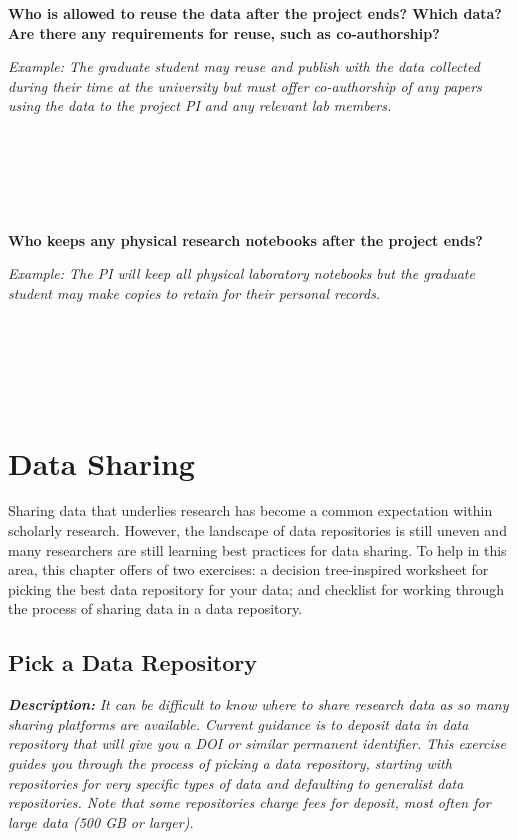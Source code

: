\documentclass[
]{book}
\begin{document}
\textbf{Who is allowed to reuse the data after the project ends? Which data? Are there any requirements for reuse, such as co-authorship?}

\emph{Example: The graduate student may reuse and publish with the data collected during their time at the university but must offer co-authorship of any papers using the data to the project PI and any relevant lab members.}

~

~

~

\textbf{Who keeps any physical research notebooks after the project ends?}

\emph{Example: The PI will keep all physical laboratory notebooks but the graduate student may make copies to retain for their personal records.}

~

~

~

\hypertarget{data-sharing}{%
\chapter{Data Sharing}\label{data-sharing}}

Sharing data that underlies research has become a common expectation within scholarly research. However, the landscape of data repositories is still uneven and many researchers are still learning best practices for data sharing. To help in this area, this chapter offers of two exercises: a decision tree-inspired worksheet for picking the best data repository for your data; and checklist for working through the process of sharing data in a data repository.

\hypertarget{data-repository}{%
\section{Pick a Data Repository}\label{data-repository}}

\textbf{\emph{Description:}} \emph{It can be difficult to know where to share research data as so many sharing platforms are available. Current guidance is to deposit data in data repository that will give you a DOI or similar permanent identifier. This exercise guides you through the process of picking a data repository, starting with repositories for very specific types of data and defaulting to generalist data repositories. Note that some repositories charge fees for deposit, most often for large data (500 GB or larger).}
\end{document}
